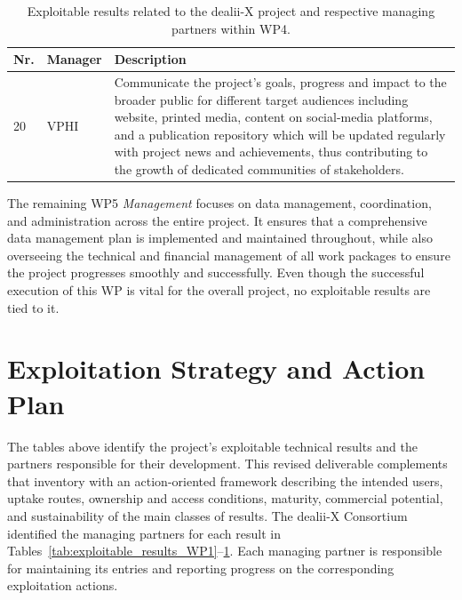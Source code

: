\documentclass[a4paper,12pt]{article}
\begin{document}
\begin{center}
    \small
    \renewcommand{\arraystretch}{1.25}
    \begin{longtable}{|l|p{2.5cm}|p{12cm}|}
    \caption{Exploitable results related to the dealii-X project and respective managing partners within WP4.}
    \label{tab:exploitable_results_WP4}
    \\
    \hline
    \textbf{Nr.} & \textbf{Manager} & \textbf{Description} \\
    \hline
    20 & VPHI &
    Communicate the project's goals, progress and impact to the broader public for different target audiences including website, printed media, content on social-media platforms, and a publication repository which will be updated regularly with project news and achievements, thus contributing to the growth of dedicated communities of stakeholders.
    \\
    \hline
    \end{longtable}
\end{center}

The remaining WP5 \textit{Management} focuses on data management, coordination, and administration across the entire project. It ensures that a comprehensive data management plan is implemented and maintained throughout, while also overseeing the technical and financial management of all work packages to ensure the project progresses smoothly and successfully. Even though the successful execution of this WP is vital for the overall project, no exploitable results are tied to it.


\section{Exploitation Strategy and Action Plan}
\label{sec:exploitation_strategy}

The tables above identify the project's exploitable technical results and
the partners responsible for their development. This revised deliverable
complements that inventory with an action-oriented framework describing the
intended users, uptake routes, ownership and access conditions, maturity,
commercial potential, and sustainability of the main classes of results.
The dealii-X Consortium identified the managing partners for each result in
Tables~\ref{tab:exploitable_results_WP1}--\ref{tab:exploitable_results_WP4}.
Each managing partner is responsible for maintaining its entries and
reporting progress on the corresponding exploitation actions.
\end{document}
